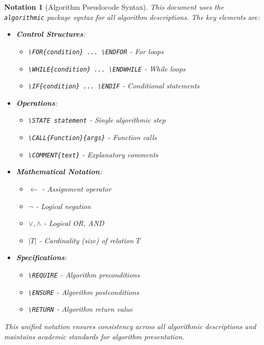 \documentclass[12pt,a4paper]{article}
\newtheorem{notation}{Notation}[section]
\begin{document}
    \begin{notation}[Algorithm Pseudocode Syntax]
        This document uses the \texttt{algorithmic} package syntax for all algorithm descriptions. The key elements are:

        \begin{itemize}
            \item \textbf{Control Structures}:
            \begin{itemize}
                \item \texttt{\textbackslash FOR\{condition\} ... \textbackslash ENDFOR} - For loops
                \item \texttt{\textbackslash WHILE\{condition\} ... \textbackslash ENDWHILE} - While loops
                \item \texttt{\textbackslash IF\{condition\} ... \textbackslash ENDIF} - Conditional statements
            \end{itemize}
            \item \textbf{Operations}:
            \begin{itemize}
                \item \texttt{\textbackslash STATE statement} - Single algorithmic step
                \item \texttt{\textbackslash CALL\{Function\}\{args\}} - Function calls
                \item \texttt{\textbackslash COMMENT\{text\}} - Explanatory comments
            \end{itemize}
            \item \textbf{Mathematical Notation}:
            \begin{itemize}
                \item $\leftarrow$ - Assignment operator
                \item $\neg$ - Logical negation
                \item $\lor, \land$ - Logical OR, AND
                \item $|T|$ - Cardinality (size) of relation $T$
            \end{itemize}
            \item \textbf{Specifications}:
            \begin{itemize}
                \item \texttt{\textbackslash REQUIRE} - Algorithm preconditions
                \item \texttt{\textbackslash ENSURE} - Algorithm postconditions
                \item \texttt{\textbackslash RETURN} - Algorithm return value
            \end{itemize}
        \end{itemize}

        This unified notation ensures consistency across all algorithmic descriptions and maintains academic standards for algorithm presentation.
    \end{notation}
\end{document}

